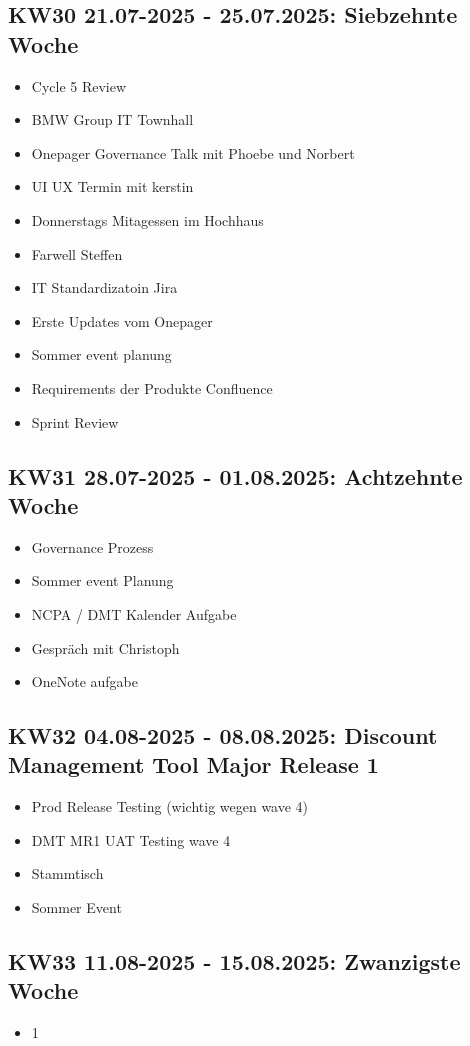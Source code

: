 \subsection{KW30 21.07-2025 - 25.07.2025: Siebzehnte Woche}
\begin{itemize}
  \item Cycle 5 Review
  \item BMW Group IT Townhall
  \item Onepager Governance Talk mit Phoebe und Norbert
  \item UI UX Termin mit kerstin
  \item Donnerstags Mitagessen im Hochhaus
  \item Farwell Steffen
  \item IT Standardizatoin Jira
  \item Erste Updates vom Onepager
  \item Sommer event planung
  \item Requirements der Produkte Confluence
  \item Sprint Review
\end{itemize}


\subsection{KW31 28.07-2025 - 01.08.2025: Achtzehnte Woche}
\begin{itemize}
  \item Governance Prozess
  \item Sommer event Planung
  \item NCPA / DMT Kalender Aufgabe
  \item Gespräch mit Christoph
  \item OneNote aufgabe
\end{itemize}


\subsection{KW32 04.08-2025 - 08.08.2025: Discount Management Tool Major Release 1}
\begin{itemize}
  \item Prod Release Testing (wichtig wegen wave 4)
  \item DMT MR1 UAT Testing wave 4
  \item Stammtisch
  \item Sommer Event
\end{itemize}


\subsection{KW33 11.08-2025 - 15.08.2025: Zwanzigste Woche}
\begin{itemize}
  \item 1
\end{itemize}


